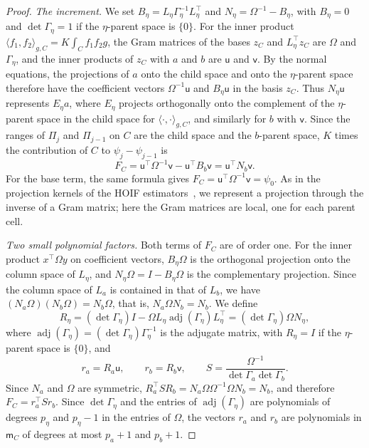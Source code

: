 \begin{proof}
\emph{The increment.} We set
$B_\eta=L_\eta\Gamma_\eta^{-1}L_\eta^\top$ and $N_\eta=\Omega^{-1}-B_\eta$,
with $B_\eta=0$ and $\det\Gamma_\eta=1$ if the $\eta$-parent space is
$\{0\}$. For the inner product $\langle f_1,f_2\rangle_{g,C}=K\int_Cf_1f_2g$,
the Gram matrices of the bases $z_C$ and $L_\eta^\top z_C$ are $\Omega$ and
$\Gamma_\eta$, and the inner products of $z_C$ with $a$ and $b$ are
$\mathsf u$ and $\mathsf v$. By the normal equations, the projections of
$a$ onto the child space and onto the $\eta$-parent space therefore have
the coefficient vectors $\Omega^{-1}\mathsf u$ and $B_\eta\mathsf u$ in
the basis $z_C$. Thus $N_\eta\mathsf u$ represents $E_\eta a$, where
$E_\eta$ projects orthogonally onto the complement of the $\eta$-parent
space in the child space for $\langle\cdot,\cdot\rangle_{g,C}$, and
similarly for $b$ with $\mathsf v$. Since the ranges of $\Pi_j$ and
$\Pi_{j-1}$ on $C$ are the child space and the $b$-parent space, $K$
times the contribution of $C$ to $\psi_j-\psi_{j-1}$ is
\[
 F_C=\mathsf u^\top\Omega^{-1}\mathsf v-\mathsf u^\top B_b\mathsf v
    =\mathsf u^\top N_b\mathsf v.
\]
For the base term, the same formula gives
$F_C=\mathsf u^\top\Omega^{-1}\mathsf v=\psi_0$. As in the projection
kernels of the HOIF estimators~\cite[p.~357]{hoif2008}, we represent a
projection through the inverse of a Gram matrix; here the Gram matrices
are local, one for each parent cell.

\emph{Two small polynomial factors.} Both terms of $F_C$ are of order one.
For the inner product $x^\top\Omega y$ on coefficient vectors, $B_\eta\Omega$
is the orthogonal projection onto the column space of $L_\eta$, and
$N_\eta\Omega=I-B_\eta\Omega$ is the complementary projection. Since the
column space of $L_a$ is contained in that of $L_b$, we have
$(N_a\Omega)(N_b\Omega)=N_b\Omega$, that is, $N_a\Omega N_b=N_b$. We define
\[
 R_\eta=(\det\Gamma_\eta)I-\Omega L_\eta\operatorname{adj}(\Gamma_\eta)
        L_\eta^\top=(\det\Gamma_\eta)\Omega N_\eta,
\]
where $\operatorname{adj}(\Gamma_\eta)=(\det\Gamma_\eta)\Gamma_\eta^{-1}$
is the adjugate matrix, with $R_\eta=I$ if the $\eta$-parent space is
$\{0\}$, and
\begin{equation}\label{eq:main-residuals}
 r_a=R_a\mathsf u,\qquad r_b=R_b\mathsf v,\qquad
 S=\frac{\Omega^{-1}}{\det\Gamma_a\det\Gamma_b}.
\end{equation}
Since $N_a$ and $\Omega$ are symmetric,
$R_a^\top SR_b=N_a\Omega\Omega^{-1}\Omega N_b=N_b$, and therefore
$F_C=r_a^\top Sr_b$. Since $\det\Gamma_\eta$ and the entries of
$\operatorname{adj}(\Gamma_\eta)$ are polynomials of degrees $p_\eta$ and
$p_\eta-1$ in the entries of $\Omega$, the vectors $r_a$ and $r_b$ are
polynomials in $\mathsf m_C$ of degrees at most $p_a+1$ and $p_b+1$.


\end{proof}
